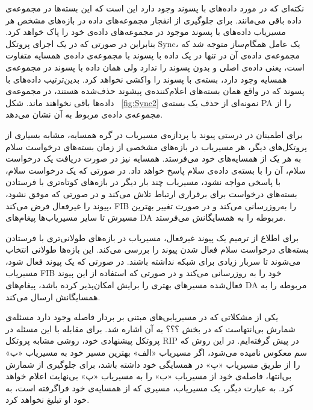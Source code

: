نکته‌ای که در مورد داده‌های با پسوند  وجود دارد این است که این بسته‌ها در مجموعه‌ی داده باقی می‌مانند. برای جلوگیری از انفجار مجموعه‌های داده در بازه‌های مشخص هر مسیریاب داده‌های با پسوند  موجود در مجموعه‌های داده‌ی خود را پاک خواهد کرد. بنابراین در صورتی که در یک اجرای پروتکل Sync، یک عامل همگام‌ساز متوجه شد که مجموعه‌ی داده‌ی آن در تنها در یک داده با پسوند  با مجموعه‌ی داده‌ی همسایه متفاوت است، یعنی داده‌ی اصلی و بدون پسوند را ندارد ولی همان داده با پسوند  در مجموعه‌ی همسایه وجود دارد، بسته‌ی با پسوند  را واکشی نخواهد کرد. بدین‌ترتیب داده‌های با پسوند  که در واقع همان بسته‌های اعلام‌کننده‌ی پیشوند حذف‌شده هستند، در مجموعه‌ی داده‌ها باقی نخواهند ماند. شکل ~\ref{fig:Sync2} نمونه‌ای از حذف یک بسته‌ی PA را از مجموعه‌ی داده‌ی مربوط به آن نشان می‌دهد. 



برای اطمینان در درستی پیوند یا پردازه‌ی مسیریاب در گره همسایه، مشابه بسیاری از پروتکل‌های دیگر، هر مسیریاب در بازه‌های مشخصی از زمان بسته‌های درخواست سلام به هر یک از همسایه‌های خود می‌فرستد. همسایه نیز در صورت دریافت یک درخواست سلام، آن را با بسته‌ی داده‌ی سلام پاسخ خواهد داد. در صورتی که یک درخواست سلام، با پاسخی مواجه نشود، مسیریاب چند بار دیگر در بازه‌های کوتاه‌تری با فرستادن بسته‌های درخواست برای برقراری ارتباط تلاش می‌کند و در صورتی که موفق نشود، پیوند را غیرفعال فرض می‌کند، FIB را به‌روزرسانی می‌کند و در صورت تغییر بهترین مسیرش تا سایر مسیریاب‌ها پیغام‌های DA مربوطه را به همسایگانش می‌فرستد. 

برای اطلاع از ترمیم یک پیوند غیرفعال، مسیریاب در بازه‌های طولانی‌تری با فرستادن بسته‌های درخواست سلام فعال شدن پیوند را بررسی می‌کند. این بازه‌ها طولانی انتخاب می‌شوند تا سربار زیادی برای شبکه نداشته باشند. در صورتی که یک پیوند فعال شود، مسیریاب FIB خود را به روز‌رسانی می‌کند و در صورتی که استفاده از این پیوند فعال‌شده مسیرهای بهتری را برایش امکان‌پذیر کرده باشد، پیغام‌های DA مربوطه را به همسایگانش ارسال می‌کند.


یکی از مشکلاتی که در مسیریابی‌های مبتنی بر بردار فاصله وجود دارد مسئله‌ی شمارش بی‌انتهاست که در بخش ؟؟؟‌ به آن اشاره شد. برای مقابله با این مسئله در پروتکل پیشنهادی خود، روشی مشابه پروتکل RIP در پیش گرفته‌ایم. در این روش که سم معکوس نامیده می‌شود، اگر مسیریاب «الف» بهترین مسیر خود به مسیریاب «ب» را از طریق مسیریاب «پ» در همسایگی خود داشته باشد، برای جلوگیری از شمارش بی‌انتها، فاصله‌ی خود از مسیریاب «ب» را به مسیریاب «پ» بی‌نهایت اعلام خواهد کرد. به عبارت دیگر، یک مسیریاب، مسیری که از همسایه‌ی خود فراگرفته است، به خود او تبلیغ نخواهد کرد. 

